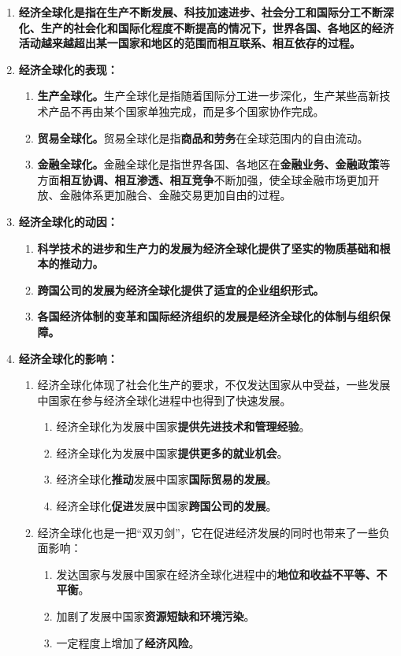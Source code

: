 \documentclass[12pt, a4paper, oneside]{ctexbook}
\begin{document}
\begin{enumerate}
\item \textbf{经济全球化是指在生产不断发展、科技加速进步、社会分工和国际分工不断深化、生产的社会化和国际化程度不断提高的情况下，世界各国、各地区的经济活动越来越超出某一国家和地区的范围而相互联系、相互依存的过程。}
\item \textbf{经济全球化的表现：}
\begin{enumerate}
\item \textbf{生产全球化。}生产全球化是指随着国际分工进一步深化，生产某些高新技术产品不再由某个国家单独完成，而是多个国家协作完成。
\item \textbf{贸易全球化。}贸易全球化是指\textbf{商品和劳务}在全球范围内的自由流动。
\item \textbf{金融全球化。}金融全球化是指世界各国、各地区在\textbf{金融业务、金融政策}等方面\textbf{相互协调、相互渗透、相互竞争}不断加强，使全球金融市场更加开放、金融体系更加融合、金融交易更加自由的过程。
\end{enumerate}
\item \textbf{经济全球化的动因：}
\begin{enumerate}
\item \textbf{科学技术的进步和生产力的发展为经济全球化提供了坚实的物质基础和根本的推动力。}
\item \textbf{跨国公司的发展为经济全球化提供了适宜的企业组织形式。}
\item \textbf{各国经济体制的变革和国际经济组织的发展是经济全球化的体制与组织保障。}
\end{enumerate}
\item \textbf{经济全球化的影响：}
\begin{enumerate}
\item 经济全球化体现了社会化生产的要求，不仅发达国家从中受益，一些发展中国家在参与经济全球化进程中也得到了快速发展。
\begin{enumerate}
\item 经济全球化为发展中国家\textbf{提供先进技术和管理经验}。
\item 经济全球化为发展中国家\textbf{提供更多的就业机会}。
\item 经济全球化\textbf{推动}发展中国家\textbf{国际贸易的发展}。
\item 经济全球化\textbf{促进}发展中国家\textbf{跨国公司的发展}。
\end{enumerate}
\item 经济全球化也是一把“双刃剑”，它在促进经济发展的同时也带来了一些负面影响：
\begin{enumerate}
\item 发达国家与发展中国家在经济全球化进程中的\textbf{地位和收益不平等、不平衡}。
\item 加剧了发展中国家\textbf{资源短缺和环境污染}。
\item 一定程度上增加了\textbf{经济风险}。
\end{enumerate}
\end{enumerate}
\end{enumerate}
\end{document}
